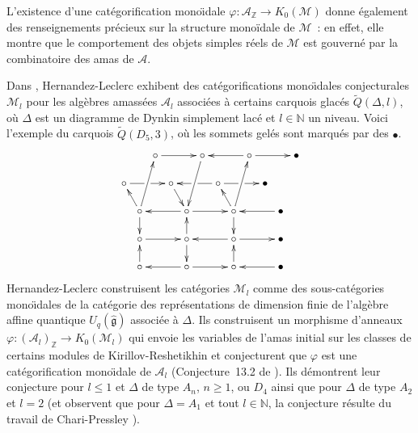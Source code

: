 \documentclass[brochure,12pt]{bourbaki}
\newcommand{\og}{\guillemotleft\hspace*{1pt}}
\newcommand{\fg}{\hspace*{1pt}\guillemotright}
\numberwithin{equation}{subsection}
\numberwithin{theorem}{section}
\newcommand{\Z}{\mathbb{Z}}
\newcommand{\N}{\mathbb{N}}
\newcommand{\ca}{{\mathcal A}}
\newcommand{\cm}{{\mathcal M}}
\renewcommand{\phi}{\varphi}
\renewcommand{\hat}[1]{\widehat{#1}}
\renewcommand{\tilde}[1]{\widetilde{#1}}
\begin{document}
L'existence d'une cat\'egorification mono\"{\i}dale $\phi: \ca_\Z \to K_0(\cm)$
donne \'egalement des renseignements pr\'ecieux sur la structure mono\"idale
de $\cm$~: en effet, elle montre que le comportement des objets simples r\'eels
de $\cm$ est gouvern\'e par la combinatoire des amas de $\ca$.

Dans \cite{HernandezLeclerc09}, Hernandez-Leclerc exhibent des
cat\'egorifications mono\"{\i}dales conjecturales $\cm_l$ pour les
alg\`ebres amass\'ees $\ca_l$ associ\'ees \`a certains carquois
glac\'es $\tilde{Q}(\Delta,l)$, o\`u $\Delta$ est un diagramme de Dynkin
simplement lac\'e et $l\in\N$ un \og niveau\fg. Voici l'exemple du
carquois $\tilde{Q}(D_5, 3)$, o\`u les sommets gel\'es sont
marqu\'es par des $\bullet$.
\[
\xymatrix@C=0.1cm@R=0.5cm{ & & \circ \ar[rrr] &  &  & \circ \ar[ldd] & & &
\circ \ar[lll] \ar[rrr] & & & \bullet  \\
     \circ \ar[rrr]|!{[dr];[urr]}\hole & &  & \circ \ar[rd] & & &
\circ \ar[lll]|!{[lu];[dll]}\hole \ar[rrr]|!{[rd];[rru]}\hole & & & \bullet  & &  \\
           & \circ \ar[lu] \ar[ruu] \ar[d] & & & \circ \ar[lll] \ar[rrr] & & &
\circ \ar[ruu] \ar[lu] \ar[d] & & & \bullet \ar[lll] & \\
           & \circ \ar[rrr] & & & \circ \ar[d] \ar[u] & & &
\circ \ar[lll] \ar[rrr] & & & \bullet  & \\
           & \circ \ar[u] & & & \circ \ar[lll] \ar[rrr] &  & &
\circ \ar[u] & & & \bullet \ar[lll] &
}
\]
Hernandez-Leclerc construisent les cat\'egories $\cm_l$ comme des sous-cat\'egories
mono\"{\i}dales de la cat\'egorie des repr\'esentations de dimension finie de
l'alg\`ebre affine quantique $U_q(\hat{\mathfrak{g}})$ associ\'ee \`a $\Delta$.
Ils construisent un morphisme d'anneaux $\phi: (\ca_l)_\Z \to K_0(\cm_l)$ qui
envoie les variables de l'amas initial sur les classes de certains modules
de Kirillov-Reshetikhin et conjecturent que $\phi$ est une cat\'egorification
mono\"{\i}dale de $\ca_l$ (Conjecture~13.2 de \cite{HernandezLeclerc09}).
Ils d\'emontrent leur conjecture pour $l\leq 1$ et $\Delta$ de
type $A_n$, $n\geq 1$, ou $D_4$ ainsi que pour $\Delta$ de type $A_2$ et $l=2$
(et observent que pour $\Delta=A_1$ et tout $l\in \N$, la conjecture r\'esulte du
travail de Chari-Pressley \cite{ChariPressley91}).
\end{document}
